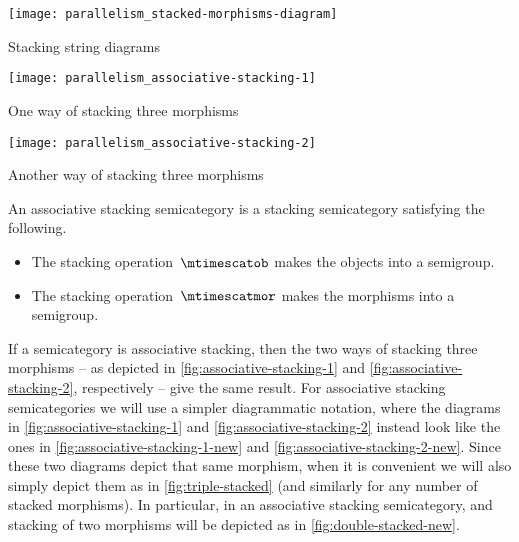 \begin{marginfigure}
    \centering
    \texttt{[image: parallelism\_stacked-morphisms-diagram]}
    \caption{Stacking string diagrams}
    \label{fig:stacked-morphisms-diagram}
\end{marginfigure}

\begin{marginfigure}[]
    \centering
    \texttt{[image: parallelism\_associative-stacking-1]}
    \caption{One way of stacking three morphisms}
    \label{fig:associative-stacking-1}
\end{marginfigure}

\begin{marginfigure}
    \centering
    \texttt{[image: parallelism\_associative-stacking-2]}
    \caption{Another way of stacking three morphisms}
    \label{fig:associative-stacking-2}
\end{marginfigure}

\begin{ctdefinition}
    \label{def:stacking-semi-cat}
    An associative stacking semicategory is a stacking semicategory satisfying the following.

    \condit
    \begin{itemize}
        \item The stacking operation~$\mtimescatob$ makes the objects into a semigroup.
        \item The stacking operation~$\mtimescatmor$ makes the morphisms into a semigroup.
    \end{itemize}
\end{ctdefinition}

If a semicategory is associative stacking, then the two ways of stacking three morphisms -- as depicted in \cref{fig:associative-stacking-1} and \cref{fig:associative-stacking-2}, respectively -- give the same result.
For associative stacking semicategories we will use a simpler diagrammatic notation, where the diagrams in \cref{fig:associative-stacking-1} and \cref{fig:associative-stacking-2} instead look like the ones in \cref{fig:associative-stacking-1-new} and \cref{fig:associative-stacking-2-new}.
Since these two diagrams depict that same morphism, when it is convenient we will also simply depict them as in \cref{fig:triple-stacked} (and similarly for any number of stacked morphisms).
In particular, in an associative stacking semicategory, and stacking of two morphisms will be depicted as in \cref{fig:double-stacked-new}.

